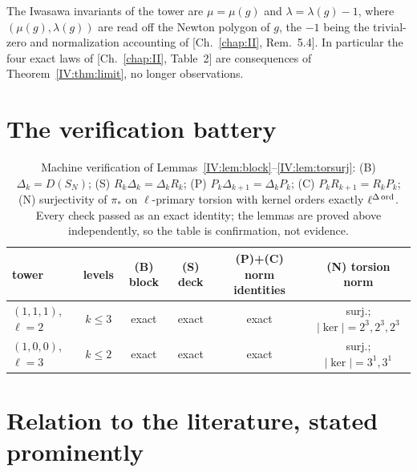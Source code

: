 \begin{corollary}\label{IV:cor:invariants}
The Iwasawa invariants of the tower are $\mu=\mu(g)$ and $\lambda=\lambda(g)-1$,
where $(\mu(g),\lambda(g))$ are read off the Newton polygon of $g$, the $-1$ being
the trivial-zero and normalization accounting of {\rm[Ch.~\ref{chap:II}, Rem.~5.4]}. In particular
the four exact laws of {\rm[Ch.~\ref{chap:II}, Table~2]} are consequences of
Theorem~\ref{IV:thm:limit}, no longer observations.
\end{corollary}

\section{The verification battery}\label{IV:sec:battery}

\begin{table}[ht]
\centering\small
\renewcommand{\arraystretch}{1.2}
\begin{tabular}{lccccc}
\toprule
tower & levels & (B) block & (S) deck & (P)+(C) norm identities & (N) torsion norm\\
\midrule
$(1,1,1)$, $\ell=2$ & $k\le3$ & exact & exact & exact & surj.; $|\ker|=2^3,2^3,2^3$\\
$(1,0,0)$, $\ell=3$ & $k\le2$ & exact & exact & exact & surj.; $|\ker|=3^1,3^1$\\
\bottomrule
\end{tabular}
\medskip
\caption{Machine verification of Lemmas~\ref{IV:lem:block}--\ref{IV:lem:torsurj}:
(B) $\Delta_k=D(S_N)$; (S) $R_k\Delta_k=\Delta_kR_k$; (P) $P_k\Delta_{k+1}
=\Delta_kP_k$; (C) $P_kR_{k+1}=R_kP_k$; (N) surjectivity of $\pi_*$ on
$\ell$-primary torsion with kernel orders exactly
$\ell^{\Delta\operatorname{ord}}$. Every check passed as an exact identity; the lemmas are proved
above independently, so the table is confirmation, not evidence.}
\label{IV:tab:battery}
\end{table}

\section{Relation to the literature, stated prominently}\label{IV:sec:lit}

